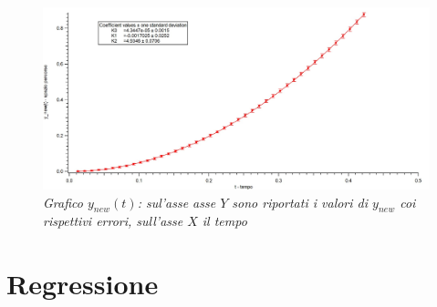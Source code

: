 \documentclass[12pt, a4paper]{article}
\begin{document}
    \begin{figure}[h]
\centering
\includegraphics[width=170mm]{Immagini/Graph1.jpg}
\caption{\textit{\footnotesize{Grafico $y_{new}(t) $: sul'asse asse $Y$ sono riportati i valori di $y_{new}$ coi rispettivi errori, sull'asse $X$ il tempo}}}
\label{Grafico parabolico}
\end{figure}


\newpage


\section{Regressione}
\end{document}
